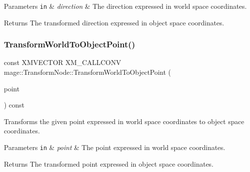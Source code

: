 \begin{DoxyParams}[1]{Parameters}
\mbox{\tt in}  & {\em direction} & The direction expressed in world space coordinates. \\
\hline
\end{DoxyParams}
\begin{DoxyReturn}{Returns}
The transformed direction expressed in object space coordinates. 
\end{DoxyReturn}
\hypertarget{structmage_1_1_transform_node_a792410956cd6577f3f840341d152ca8a}{}\label{structmage_1_1_transform_node_a792410956cd6577f3f840341d152ca8a} 
\subsubsection{\texorpdfstring{Transform\+World\+To\+Object\+Point()}{TransformWorldToObjectPoint()}}
{\footnotesize\ttfamily const X\+M\+V\+E\+C\+T\+OR X\+M\+\_\+\+C\+A\+L\+L\+C\+O\+NV mage\+::\+Transform\+Node\+::\+Transform\+World\+To\+Object\+Point (\begin{DoxyParamCaption}\item[{F\+X\+M\+V\+E\+C\+T\+OR}]{point }\end{DoxyParamCaption}) const\hspace{0.3cm}{\ttfamily [noexcept]}}

Transforms the given point expressed in world space coordinates to object space coordinates.


\begin{DoxyParams}[1]{Parameters}
\mbox{\tt in}  & {\em point} & The point expressed in world space coordinates. \\
\hline
\end{DoxyParams}
\begin{DoxyReturn}{Returns}
The transformed point expressed in object space coordinates. 
\end{DoxyReturn}
\hypertarget{structmage_1_1_transform_node_a2102425a193884bea453c783388f6a38}{}\label{structmage_1_1_transform_node_a2102425a193884bea453c783388f6a38} 
